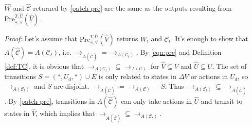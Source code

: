 \begin{theorem}
	$ \widehat{W} $ and $ \widehat{\mathcal{C}} $ returned by \eqref{patch-pre} are the same as the outputs resulting from $ \text{Pre}_{\exists,\forall}^{T,\widehat{U}}(\widehat{V})$.	\label{thm:pre}
\end{theorem}

\emph{Proof:} Let's assume that $ \text{Pre}_{\exists,\forall}^{T,\widehat{U}}(\widehat{V}) $ returns $ W_t $ and $ \mathcal{C}_t $. It's enough to show that $ A(\widehat{\mathcal{C}})= A(\mathcal{C}_t)$, i.e. $ \rightarrow_{A(\widehat{\mathcal{C}})} = \rightarrow_{A(\mathcal{C}_t)} $. By \eqref{eqn:pre} and Definition \ref{def:TC}, it is obvious that $ \rightarrow_{A(\mathcal{C}_t)} \subseteq \rightarrow_{A(\mathcal{C})}$ for $ \widehat{V}\subseteq V $ and $ \widehat{U}\subseteq U $. The set of transitions $ S = (*,U_d,*)\cup E $ is only related to states in $ \Delta V $ or actions in $ U_d $, so $\rightarrow_{A(\mathcal{C}_t)}$ and $ S $ are disjoint. $ \rightarrow_{A(\widehat{\mathcal{C}})}= \rightarrow_{A(\mathcal{C})}-S$. Thus $ \rightarrow_{A(\mathcal{C}_t)}\subseteq \rightarrow_{A(\widehat{\mathcal{C}})}$. By \eqref{patch-pre}, transitions in $ A(\widehat{\mathcal{C}}) $ can only take actions in $ \widehat{U} $ and transit to states in $ \widehat{V} $, which implies that $ \rightarrow_{A(\widehat{\mathcal{C}})}\subseteq \rightarrow_{A(\mathcal{C}_t)} $. \QEDB 


